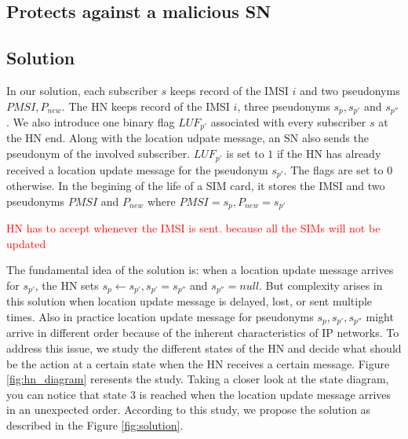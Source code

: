 \documentclass{llncs} %
\begin{document}
\subsection{Protects against a malicious SN}

\subsection{Solution}
In our solution, each subscriber $s$ keeps record of the IMSI $i$ and two pseudonyms $PMSI,P_{new}$. The HN keeps record of the IMSI $i$, three pseudonyms $s_p,s_{p'}$ and $s_{p''}$. We also introduce one binary flag $LUF_{p'}$ associated with every subscriber $s$ at the HN end. Along with the location udpate message, an SN also sends the pseudonym of the involved subscriber.  $LUF_{p'}$ is set to $1$ if the HN has already received a location update message for the pseudonym $s_{p'}$. The flags are set to $0$ otherwise. In the begining of the life of a SIM card, it stores the IMSI and two pseudonyms $PMSI$ and $P_{new}$ where $PMSI = s_p, P_{new} = s_{p'}$

\textcolor{red}{HN has to accept whenever the IMSI is sent. because all the SIMs will not be updated}

The fundamental idea of the solution is: when a location update message arrives for $s_{p'}$, the HN sets $s_p \leftarrow s_{p'}, s_{p'} = s_{p''}$ and $s_{p''} = null$. But complexity arises in this solution when location update message is delayed,  lost, or sent multiple times. Also in practice location update message for pseudonyms $s_{p},s_{p'},s_{p''}$ might arrive in different order because of the inherent characteristics of IP networks. To address this issue, we study the different states of  the HN and decide what should be the action at a certain state when the HN receives a certain message. Figure \ref{fig:hn_diagram} reresents the study. Taking a closer look at the state diagram, you can notice that state $3$ is reached when the location update message arrives in an unexpected order. According to this study, we propose the solution as described in the  Figure \ref{fig:solution}.
\end{document}
